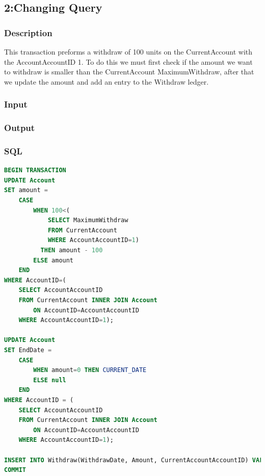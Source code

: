 \documentclass[a4paper, 10pt]{article}
\begin{document}
\subsection{2:Changing Query}
\subsubsection{Description}
This transaction preforms a withdraw of 100 units on the CurrentAccount with the AccountAccountID 1. To do this we must first check if the amount we want to withdraw is smaller than the CurrentAccount MaximumWithdraw, after that we update the amount and add an entry to the Withdraw ledger.

\subsubsection{Input}
\subsubsection{Output}

\subsubsection{SQL}
\begin{lstlisting}[language=SQL]
BEGIN TRANSACTION
UPDATE Account
SET amount =
    CASE 
        WHEN 100<(
            SELECT MaximumWithdraw 
            FROM CurrentAccount 
            WHERE AccountAccountID=1) 
          THEN amount - 100
        ELSE amount
    END
WHERE AccountID=(
    SELECT AccountAccountID 
    FROM CurrentAccount INNER JOIN Account 
        ON AccountID=AccountAccountID 
    WHERE AccountAccountID=1);

UPDATE Account
SET EndDate =
    CASE 
        WHEN amount=0 THEN CURRENT_DATE
        ELSE null
    END
WHERE AccountID = (
    SELECT AccountAccountID 
    FROM CurrentAccount INNER JOIN Account 
        ON AccountID=AccountAccountID 
    WHERE AccountAccountID=1);

INSERT INTO Withdraw(WithdrawDate, Amount, CurrentAccountAccountID) VALUES(CURRENT_DATE, 100, 1);
COMMIT
\end{lstlisting}
\end{document}
